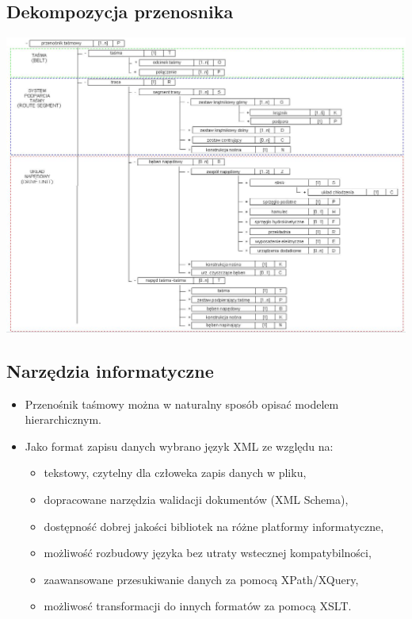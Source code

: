 \documentclass{beamer}
\begin{document}
\subsection{Dekompozycja przenosnika}
\begin{frame}
\includegraphics[width=\textwidth]{beamer/struktura_word}
\end{frame}

\subsection{Narzędzia informatyczne}
\begin{frame}
\begin{itemize}
\item Przenośnik taśmowy można w naturalny sposób opisać modelem
  hierarchicznym.
\item Jako format zapisu danych wybrano język XML ze względu na:
\begin{itemize}
  \item tekstowy, czytelny dla człoweka zapis danych w pliku,
  \pause\item dopracowane narzędzia walidacji dokumentów (XML Schema),
  \pause\item dostępność dobrej jakości bibliotek na różne platformy
    informatyczne,
  \pause\item możliwość rozbudowy języka bez utraty wstecznej
    kompatybilności,
  \pause\item zaawansowane przesukiwanie danych za pomocą XPath/XQuery,
  \item możliwosć transformacji do innych formatów za pomocą XSLT.
\end{itemize}
\end{itemize}
\end{frame}
\end{document}
